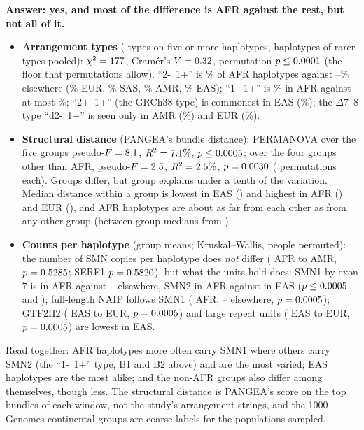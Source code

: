 \textbf{Answer: yes, and most of the difference is AFR against the rest, but not all of it.}
\begin{itemize}
\item \textbf{Arrangement types} (\anTypes{} types on five or more haplotypes, \anRare{} haplotypes of rarer types
pooled): $\chi^2=177$, Cram\'er's $V=0.32$, permutation $p\le0.0001$ (the floor that \anPerm{} permutations allow).
``2-~1+'' is \shTwoMOnePAfr\% of AFR haplotypes against \shTwoMOnePEur--\shTwoMOnePEas\% elsewhere (\shTwoMOnePEur\%
EUR, \shTwoMOnePSas\% SAS, \shTwoMOnePAmr\% AMR, \shTwoMOnePEas\% EAS); ``1-~1+'' is \shOneMOnePAfr\% in AFR against
at most \shOneMOnePSas\%; ``2+~1+'' (the GRCh38 type) is commonest in EAS (\shTwoPOnePEas\%); the $\Delta$7--8
type ``d2-~1+'' is seen only in AMR (\shDelTwoAmr\%) and EUR (\shDelTwoEur\%).
\item \textbf{Structural distance} (PANGEA's bundle distance): PERMANOVA over the five groups pseudo-$F=8.1$,
$R^2=7.1\%$, $p\le0.0005$; over the four groups other than AFR, pseudo-$F=2.5$, $R^2=2.5\%$,
$p=0.0030$ (\anPermPA{} permutations each). Groups differ, but group explains under a tenth of the variation.
Median distance within a group is lowest in EAS (\anWEas) and highest in AFR (\anWAfr) and EUR (\anWEur), and AFR
haplotypes are about as far from each other as from any other group (between-group medians from \anAfrBetweenMin).
\item \textbf{Counts per haplotype} (group means; Kruskal--Wallis, people permuted):
the number of SMN copies per haplotype does \emph{not} differ (\anSmnAfr{} AFR to \anSmnAmr{} AMR, $p=0.5285$;
SERF1 $p=0.5820$), but what the units hold does: SMN1 by exon 7 is \anOneAfr{} in AFR against
\anOneEas--\anOneSas{} elsewhere, SMN2 \anTwoAfr{} in AFR against \anTwoEas{} in EAS ($p\le0.0005$ and \anPTwo);
full-length NAIP follows SMN1 (\anNaipAfr{} AFR, \anNaipAmr--\anNaipEas{} elsewhere, $p=0.0005$); GTF2H2
(\anGtfEas{} EAS to \anGtfEur{} EUR, $p=0.0005$) and large repeat units (\anUnitsEas{} EAS to \anUnitsEur{} EUR,
$p=0.0005$) are lowest in EAS.
\end{itemize}
Read together: AFR haplotypes more often carry SMN1 where others carry SMN2 (the ``1-~1+'' type, B1 and B2 above) and are the
most varied; EAS haplotypes are the most alike; and the non-AFR groups also differ among themselves, though less.
The structural distance is PANGEA's score on the top bundles of each window, not the study's arrangement strings, and
the 1000 Genomes continental groups are coarse labels for the populations sampled.

